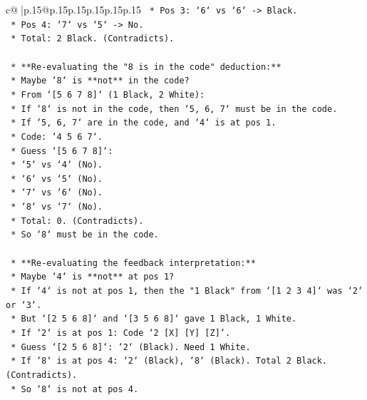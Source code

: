 \documentclass{article}
\begin{document}
{\begin{supertabular}{c@{$\;$}|p{.15\linewidth}@{}p{.15\linewidth}p{.15\linewidth}p{.15\linewidth}p{.15\linewidth}p{.15\linewidth}}
{{{\texttt{        *   Pos 3: `6` vs `6` {-}> Black.} \\
\texttt{        *   Pos 4: `7` vs `5` {-}> No.} \\
\texttt{        *   Total: 2 Black. (Contradicts).} \\
\\ 
\texttt{    *   **Re{-}evaluating the "8 is in the code" deduction:**} \\
\texttt{        *   Maybe `8` is **not** in the code?} \\
\texttt{        *   From `{[}5 6 7 8{]}` (1 Black, 2 White):} \\
\texttt{            *   If `8` is not in the code, then `5, 6, 7` must be in the code.} \\
\texttt{            *   If `5, 6, 7` are in the code, and `4` is at pos 1.} \\
\texttt{            *   Code: `4 5 6 7`.} \\
\texttt{            *   Guess `{[}5 6 7 8{]}`:} \\
\texttt{                *   `5` vs `4` (No).} \\
\texttt{                *   `6` vs `5` (No).} \\
\texttt{                *   `7` vs `6` (No).} \\
\texttt{                *   `8` vs `7` (No).} \\
\texttt{                *   Total: 0. (Contradicts).} \\
\texttt{            *   So `8` must be in the code.} \\
\\ 
\texttt{    *   **Re{-}evaluating the feedback interpretation:**} \\
\texttt{        *   Maybe `4` is **not** at pos 1?} \\
\texttt{        *   If `4` is not at pos 1, then the "1 Black" from `{[}1 2 3 4{]}` was `2` or `3`.} \\
\texttt{        *   But `{[}2 5 6 8{]}` and `{[}3 5 6 8{]}` gave 1 Black, 1 White.} \\
\texttt{        *   If `2` is at pos 1: Code `2 {[}X{]} {[}Y{]} {[}Z{]}`.} \\
\texttt{            *   Guess `{[}2 5 6 8{]}`: `2` (Black). Need 1 White.} \\
\texttt{            *   If `8` is at pos 4: `2` (Black), `8` (Black). Total 2 Black. (Contradicts).} \\
\texttt{            *   So `8` is not at pos 4.} \\
}}}
\end{supertabular}}
\end{document}
